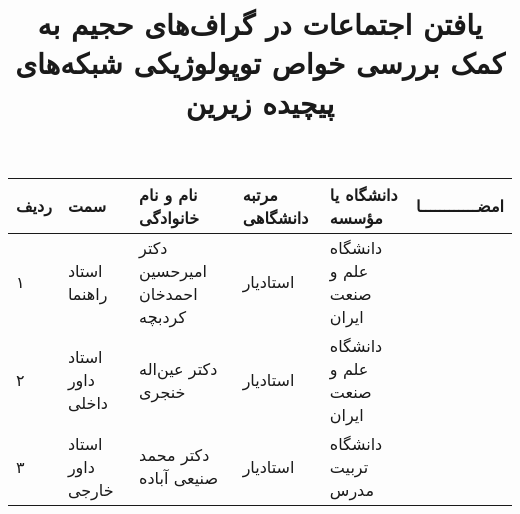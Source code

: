 \subject{مهندسی کامپیوتر}
\title{یافتن اجتماعات در گراف‌های حجیم به کمک بررسی خواص توپولوژیکی شبکه‌های 
پیچیده زیرین}


\firstPage
\besmPage
\davaranPage

\begin{center}
\begin{tabular}{| p{8mm} | p{18mm} | p{} |p{14mm}|p{}|c|}
\hline
ردیف	& سمت & نام و نام خانوادگی & مرتبه \newline دانشگاهی &	دانشگاه یا مؤسسه & امضــــــــــــا\\
\hline
۱  & استاد راهنما & دکتر \newline امیرحسین احمدخان کردبچه
& استادیار & دانشگاه \newline علم و صنعت ایران &  \\
\hline
۲ & استاد داور \newline داخلی	 & دکتر \newline عین‌اله خنجری  & استادیار & 
دانشگاه  \newline علم ‌و صنعت ایران & \\
\hline
۳ &	استاد داور \newline  خارجی  & دکتر 
\newline محمد صنیعی آباده
& استادیار & دانشگاه \newline  تربیت مدرس & \\
\hline
\end{tabular}
\end{center}


